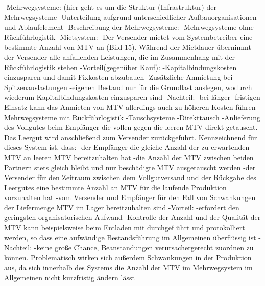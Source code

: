 -Mehrwegsysteme: (hier geht es um die Struktur (Infrastruktur) der Mehrwegsysteme
    -Unterteilung aufgrund unterschiedlicher Aufbauorganisationen und Ablaufelement
        -Beschreibung der Mehrwegsysteme:
            -Mehrwegsysteme ohne Rückführlogistik
                -Mietsystem:
                    -Der Versender mietet vom Systembetreiber eine bestimmte Anzahl von MTV an (Bild 15). Während der Mietdauer übernimmt der Versender alle anfallenden Leistungen, die im Zusammenhang mit der Rückführlogistik stehen
                        -Vorteil(gegenüber Kauf):
                            -Kapitalbindungskosten einzusparen und damit Fixkosten abzubauen
                            -Zusätzliche Anmietung bei Spitzenauslastungen
                                -eigenen Bestand nur für die Grundlast auslegen, wodurch wiederum Kapitalbindungskosten einzusparen sind
                        -Nachteil:
                            -bei länger- fristigen Einsatz kann das Anmieten von MTV allerdings auch zu höheren Kosten führen
            -Mehrwegsysteme mit Rückführlogistik
                -Tauschsysteme
                    -Direkttausch
                        -Anlieferung des Vollgutes beim Empfänger die vollen gegen die leeren MTV direkt getauscht. Das Leergut wird anschließend zum Versender zurückgeführt. Kennzeichnend für dieses System ist, dass:
                            -der Empfänger die gleiche Anzahl der zu erwartenden MTV an leeren MTV bereitzuhalten hat
                            -die Anzahl der MTV zwischen beiden Partnern stets gleich bleibt und nur beschädigte MTV ausgetauscht werden 
                            -der Versender für den Zeitraum zwischen dem Vollgutversand und der Rückgabe des Leergutes eine bestimmte Anzahl an MTV für die laufende Produktion vorzuhalten hat
                            -vom Versender und Empfänger für den Fall von Schwankungen der Liefermenge MTV im Lager bereitzuhalten sind
                        -Vorteil:
                            -erfordert den geringsten organisatorischen Aufwand
                            -Kontrolle der Anzahl und der Qualität der MTV kann beispielsweise beim Entladen mit durchgef ührt und protokolliert werden, so dass eine aufwändige Bestandsführung im Allgemeinen überflüssig ist
                        -Nachteil:
                            -keine große Chance, Beanstandungen verursachergerecht zuordnen zu können. Problematisch wirken sich außerdem Schwankungen in der Produktion aus, da sich innerhalb des Systems die Anzahl der MTV im Mehrwegsystem im Allgemeinen nicht kurzfristig ändern lässt
